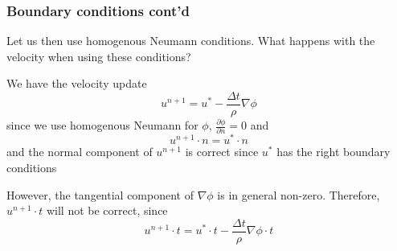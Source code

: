 \begin{frame}
\frametitle{Boundary conditions cont'd}
Let us then use homogenous Neumann conditions. 
What happens with the velocity when using these conditions? 

\vspace{0.3cm}
We have the velocity update 
\[
u^{n+1} =  u^*- \frac{\Delta t}{\rho} \nabla \phi 
\]
since we use homogenous Neumann for $\phi$, $\frac{\partial \phi}{\partial n} = 0$
and 
\[
u^{n+1} \cdot n =  u^* \cdot n  
\]
and the \alert{normal component of $u^{n+1}$ is correct} since $u^*$ has the right boundary conditions  

\vspace{0.3cm}
However, the tangential component of $\nabla \phi$ is in general non-zero.
Therefore,  \alert{$u^{n+1} \cdot t$ will not be correct}, since   
\[
u^{n+1} \cdot t =  u^* \cdot t - \frac{\Delta t}{\rho} \nabla \phi \cdot t 
\]

\end{frame}
